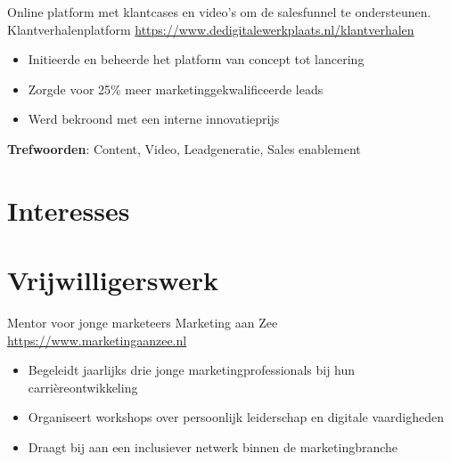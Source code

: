 \documentclass[a4paper, serif, 10pt]{moderncv}
\begin{document}
        {Online platform met klantcases en video's om de salesfunnel te ondersteunen.}
        {Klantverhalenplatform}
        {\url{https://www.dedigitalewerkplaats.nl/klantverhalen}}
        {}
        {\begin{itemize}
\item Initieerde en beheerde het platform van concept tot lancering
\item Zorgde voor 25\% meer marketinggekwalificeerde leads
\item Werd bekroond met een interne innovatieprijs
\end{itemize}
\textbf{Trefwoorden}: Content, Video, Leadgeneratie, Sales enablement}
\section{Interesses}

\section{Vrijwilligerswerk}

        {Mentor voor jonge marketeers}
        {Marketing aan Zee}
        {\url{https://www.marketingaanzee.nl}}
        {}
        {\begin{itemize}
\item Begeleidt jaarlijks drie jonge marketingprofessionals bij hun carrièreontwikkeling
\item Organiseert workshops over persoonlijk leiderschap en digitale vaardigheden
\item Draagt bij aan een inclusiever netwerk binnen de marketingbranche
\end{itemize}}
    
\end{document}
